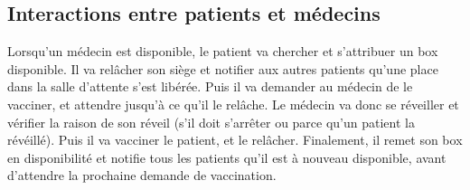 \documentclass[a4paper]{article}
\begin{document}
  \subsection{Interactions entre patients et médecins}


  Lorsqu'un médecin est disponible, le patient va chercher et s'attribuer un box disponible. Il va relâcher son siège et notifier aux autres patients qu'une place dans la salle d'attente s'est libérée. Puis il va demander au médecin de le vacciner, et attendre jusqu'à ce qu'il le relâche. Le médecin va donc se réveiller et vérifier la raison de son réveil (s'il doit s'arrêter ou parce qu'un patient la révéillé). Puis il va vacciner le patient, et le relâcher. Finalement, il remet son box en disponibilité et notifie tous les patients qu'il est à nouveau disponible, avant d'attendre la prochaine demande de vaccination.
\end{document}
